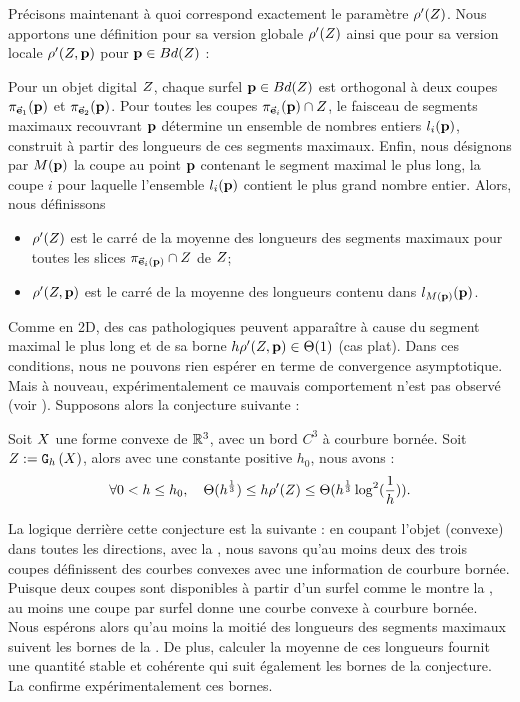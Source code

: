 %
Précisons maintenant à quoi correspond exactement le paramètre
$\rho'(Z)$. Nous apportons une définition pour sa version globale
$\rho'(Z)$ ainsi que pour sa version locale $\rho'(Z, \mathbf{p})$ pour
$\mathbf{p} \in Bd({Z})$ :
%
\begin{definition}
  \label{def:rho-dig-3d}
  Pour un objet digital $Z$, chaque surfel $\mathbf{p} \in Bd({Z})$ est
  orthogonal à deux coupes $\pi_{\vec{\mathbf{e}}_1}(\mathbf{p})$ et $\pi_{\vec{\mathbf{e}}_2}(\mathbf{p})$.
  Pour toutes les coupes $\pi_{\vec{\mathbf{e}}_i}(\mathbf{p}) \cap Z$, le faisceau de
  segments maximaux recouvrant $\mathbf{p}$ détermine un ensemble de nombres entiers
  $l_i(\mathbf{p})$, construit à partir des longueurs de ces segments maximaux. Enfin,
  nous désignons par $M(\mathbf{p})$ la coupe au point $\mathbf{p}$ contenant le segment
  maximal le plus long, \cad la coupe $i$ pour laquelle l'ensemble $l_i(\mathbf{p})$
  contient le plus grand nombre entier. Alors, nous définissons
  \begin{itemize}
    \item $\rho'(Z)$ est le carré de la moyenne des longueurs des segments maximaux pour toutes les slices $\pi_{\vec{\mathbf{e}}_i(\mathbf{p})} \cap Z$ de $Z$;
    \item $\rho'(Z, \mathbf{p})$ est le carré de la moyenne des longueurs contenu dans $l_{M(\mathbf{p})}(\mathbf{p})$.
  \end{itemize}
\end{definition}
%
Comme en 2D, des cas pathologiques peuvent apparaître à cause du segment maximal
le plus long et de sa borne $h\rho'(Z, \mathbf{p}) \in \Theta(1)$ (cas plat).
Dans ces conditions, nous ne pouvons rien espérer en terme de convergence
asymptotique. Mais à nouveau, expérimentalement ce mauvais comportement n'est
pas observé (voir ).
%
Supposons alors la conjecture suivante :
%
\begin{conjecture}
\label{conj:slice-mdss-3d}
  Soit $X$ une forme convexe de $\mathbb{R}^3$, avec un bord $C^3$ à courbure
  bornée. Soit $Z := \mathtt{G}_{h}\left(X\right)$, alors avec une constante positive $h_0$,
  nous avons :
  \begin{equation}
    \forall 0 < h \le h_0,\quad \Theta(h^{\frac{1}{3}}) \le h\rho'(Z) \le \Theta(h^{\frac{1}{3}} \log^2 (\frac{1}{h})) .
  \end{equation}
\end{conjecture}
%
La logique derrière cette conjecture est la suivante : en coupant l'objet (convexe) dans
toutes les directions, avec la , nous savons
qu'au moins deux des trois coupes définissent des courbes convexes avec une
information de courbure bornée. Puisque deux coupes sont disponibles à partir
d'un surfel comme le montre la , au moins une coupe
par surfel donne une courbe convexe à courbure bornée. Nous espérons alors qu'au
moins la moitié des longueurs des segments maximaux suivent les bornes de la
. De plus, calculer la moyenne de ces
longueurs fournit une quantité stable et cohérente qui suit également les bornes
de la conjecture.
La  confirme expérimentalement ces bornes.

